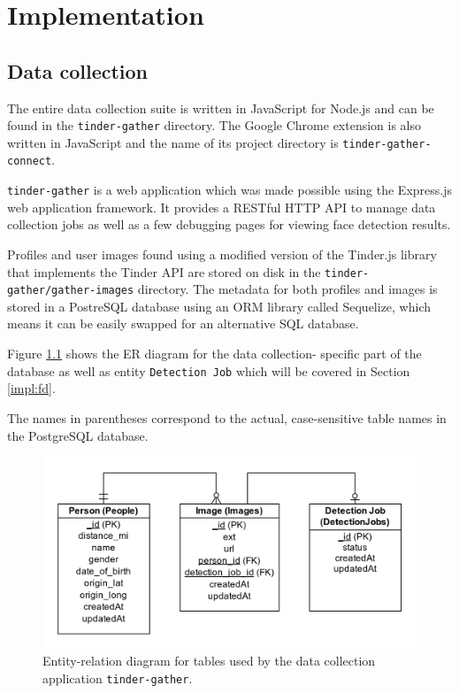 \chapter{Implementation}
\label{impl}
\section{Data collection}
The entire data collection suite is written in JavaScript for Node.js and can 
be found in the \texttt{tinder-gather} directory. The Google Chrome extension 
is also written in JavaScript and the name of its project directory is 
\texttt{tinder-gather-connect}.

\texttt{tinder-gather} is a web application which was made possible using the 
Express.js web application framework. It provides a RESTful HTTP API to manage 
data collection jobs as well as a few debugging pages for viewing face 
detection results.

Profiles and user images found using a modified version of the Tinder.js 
library that implements the Tinder API are stored on disk in the 
\texttt{tinder-gather/gather-images} directory. The metadata for both profiles 
and images is stored in a PostreSQL database using an ORM library called 
Sequelize, which means it can be easily swapped for an alternative SQL 
database.

Figure \ref{fig:impl:erd_basic} shows the ER diagram for the data collection-
specific part of the database as well as entity \texttt{Detection Job} which 
will be covered in Section \ref{impl:fd}.

The names in parentheses correspond to the actual, case-sensitive table names 
in the PostgreSQL database. 
\begin{figure}[t]
  \centering
  \includegraphics[width=\textwidth]{figures/impl/erd_basic}
  \caption{Entity-relation diagram for tables used by the data collection 
  application \texttt{tinder-gather}. }
  \label{fig:impl:erd_basic}
\end{figure}

